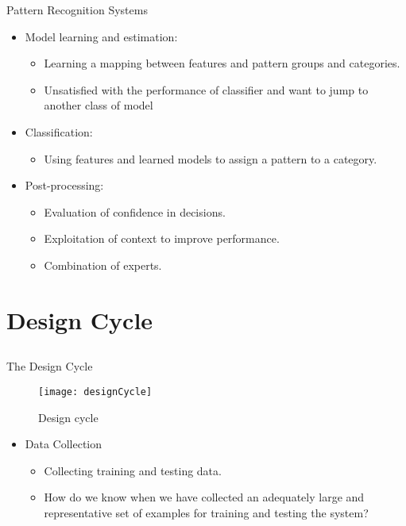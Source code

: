 \begin{frame}{Pattern Recognition Systems}
\begin{itemize}
\setlength{\itemsep}{6pt}
\item {\color{mycolor2} Model learning and estimation:}
\begin{itemize}
\item Learning a mapping between features and pattern groups and categories.
\item Unsatisfied with the performance of classifier and want to jump to another class of model
\end{itemize}
\item {\color{mycolor2}Classification:}
\begin{itemize}
\item  Using features and learned models to assign a pattern to a category.
\end{itemize}
\item {\color{mycolor2}Post-processing:}
\begin{itemize}
\item Evaluation of confidence in decisions.
\item Exploitation of context to improve performance.
\item Combination of experts.
\end{itemize} 
\end{itemize}
\end{frame}

\section{Design Cycle}
\subsection{}

\begin{frame}{The Design Cycle}
\begin{figure}
\texttt{[image: designCycle]}
\caption{Design cycle}
\end{figure}
\begin{itemize}
\item {\color{mycolor2}Data Collection}
\begin{itemize}
\item Collecting training and testing data.
\item How do we know when we have collected an adequately large and representative set of examples for training and testing the system?
\end{itemize}
\end{itemize}
\vspace{2cm}
\end{frame}

